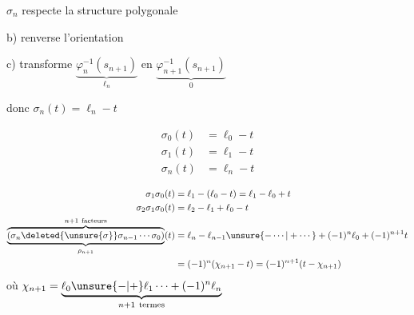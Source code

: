 

\(\sigma_n\) respecte la structure polygonale

b) renverse l'orientation

c) transforme \(\underbrace{\varphi_n^{-1}(s_{n+1})}_{\ell_n}\) en \(\underbrace{\varphi_{n+1}^{-1}(s_{n+1})}_{0}\)

donc \(\sigma_n(t)=\ell_n-t\)

\[
\begin{aligned}
\sigma_0(t)&=\ell_0-t\\
\sigma_1(t)&=\ell_1-t\\
\sigma_n(t)&=\ell_n-t
\end{aligned}
\]

\[
\begin{aligned}
\sigma_1\sigma_0(t)&=\ell_1-(\ell_0-t)=\ell_1-\ell_0+t\\
\sigma_2\sigma_1\sigma_0(t)&=\ell_2-\ell_1+\ell_0-t\\
\underbrace{\overbrace{(\sigma_n\deleted{\unsure{\sigma}}\sigma_{n-1}\cdots\sigma_0)}^{n+1\ \text{facteurs}}}_{\rho_{n+1}}(t)
&=\ell_n-\ell_{n-1}\unsure{-\cdots|+\cdots}+(-1)^n\ell_0+(-1)^{n+1}t\\
&=(-1)^n(\chi_{n+1}-t)=(-1)^{n+1}(t-\chi_{n+1})
\end{aligned}
\]
où \(\displaystyle\chi_{n+1}=\underbrace{\ell_0\unsure{-|+}\ell_1\cdots+(-1)^n\ell_n}_{n+1\ \text{termes}}\)

